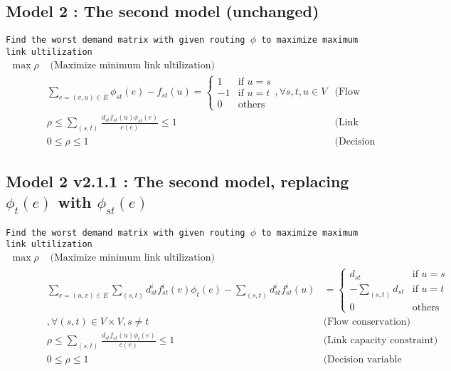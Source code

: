 \documentclass{ctexart}
\begin{document}
\subsection{Model 2 : The second model (unchanged)}
\texttt{Find the worst demand matrix with given routing $\phi$  to maximize maximum link ultilization} 
\begin{equation}
	\begin{aligned}
		\max \rho & \text{  (Maximize minimum link ultilization)}\\
		& \sum_{e=(v,u)\in E}\phi_{st}(e)-f_{st}(u)=\begin{cases}
			1 &\text{if } u=s \\
			-1 &\text{if } u=t \\
			0 &\text{others} 
		 \end{cases},\forall s,t,u\in V & \text{(Flow conservation)}\\
		& \rho\leq\sum_{(s,t)}\frac{
			d_{st}f_{st}(u)\phi_{st}(e)}{c(e)} \leq 1\ &  \text{(Link capacity constraint)} \\
		& 0\leq\rho\leq1\ & \text{(Decision variable constraint)}
	\end{aligned}
\end{equation}

\subsection{Model 2 v2.1.1 : The second model, replacing $\phi_t(e)$ with $\phi_{st}(e)$}
\texttt{Find the worst demand matrix with given routing $\phi$  to maximize maximum link ultilization} 
\begin{equation}
	\begin{aligned}
		\max \rho & \text{  (Maximize minimum link ultilization)}\\
		& \sum_{e=(u,v)\in E}\sum_{(s,t)}d_{st}^if_{st}^i(v)\phi_{t}(e)-\sum_{(s,t)}d_{st}^if_{st}^i(u) & =\begin{cases}
			d_{st} &\text{if } u=s \\
			-\sum_{(s,t)}d_{st} &\text{if } u=t \\
			0 &\text{others} 
		 \end{cases}\\
		&, \forall (s,t)\in V\times V,s\not = t& \text{(Flow conservation)}\\
		& \rho\leq\sum_{(s,t)}\frac{
			d_{st}f_{st}(u)\phi_{t}(e)}{c(e)} \leq 1\ &  \text{(Link capacity constraint)} \\
		& 0\leq\rho\leq1& \text{(Decision variable constraint)}
	\end{aligned}
\end{equation}
\end{document}
